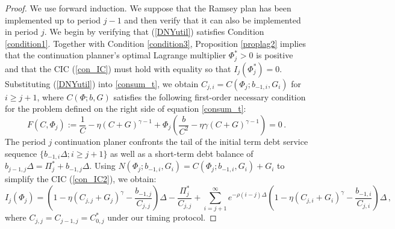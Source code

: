 \documentclass[12pt]{article}
\newcommand{\TS}[1]{{\textcolor{magenta}{#1}}}
\begin{document}
\begin{proof}
We use forward induction. %
We suppose that the Ramsey plan has been implemented up to period ${j-1}$ and then %
verify that it can also be implemented in period $j$. 
We begin by verifying that (\ref{DNYutil}) satisfies  Condition \ref{condition1}. %
Together with Condition \ref{condition3}, Proposition \ref{proplag2} implies that the continuation planner's optimal Lagrange multiplier  $\Phi_j^*>0$ is positive and  that the CIC (\ref{con_IC}) must hold with equality so that  $I_j(\Phi_j^*)=0$. 
Substituting  (\ref{DNYutil}) into \eqref{consum_t}, we obtain $C_{j, i}= C(\Phi_j; b_{-1, i}, G_{i})$ for $i\geq j+1$, where $C(\Phi; b, G)$ satisfies the following first-order necessary condition for the  problem defined on the right side of equation  \eqref{consum_t}:
\begin{equation} \label{FF} 
	F(C, \Phi_j):=\frac{1}{C} - \eta(C+G)^{\gamma-1} +\Phi_j \left(\frac{b}{C^2}- \eta\gamma (C+G)^{\gamma-1}  \right) =0\,.
\end{equation}
The period $j$ continuation planer confronts   the tail of the initial term debt service sequence  $\{b_{-1, i}\Delta; i\geq j+1\}$ as well as a  short-term debt balance of $ b_{j-1, j}\Delta = \Pi_j^* + b_{-1,j} \Delta $. %
Using $N(\Phi_j; b_{-1, i}, G_{i})= C(\Phi_j; b_{-1, i}, G_{i}) + G_{i}$ to  
simplify the CIC (\ref{con_IC2}), we obtain: 
\begin{equation}\label{IC_p3}
	I_j(\Phi_j) =\left( 1-\eta(C_{j, j}+G_{j})^\gamma-\frac{b_{-1, j}}{C_{j, j}} \right)\Delta -\frac{\Pi_{j}^*}{C_{j, j}}+  \sum_{i=j+1}^\infty e^{-\rho(i-j)\Delta}\left( 1-\eta(C_{j, i}+G_{i})^\gamma-\frac{b_{-1, i}}{C_{j, i}} \right)\Delta \, , 
\end{equation}
{where $C_{j, j}=C_{j-1, j}=C_{0, j}^*$ under our timing protocol.} 




\end{proof}
\end{document}
